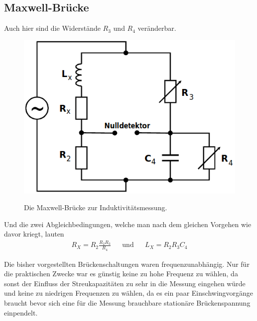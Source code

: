 \documentclass[titlepage = firstcover]{scrartcl}
\begin{document}
        \newpage

        \subsection{Maxwell-Brücke}
          Auch hier sind die Widerstände $R_3$ und $R_4$ veränderbar.
          \begin{figure}[h]
            \centering
            \caption{Die Maxwell-Brücke zur Induktivitätsmessung.}
            \includegraphics[width = 0.5\linewidth]{Maxwellbruecke.png}
            \label{fig:maxwellbr}
          \end{figure}
          Und die zwei Abgleichbedingungen, welche man nach dem gleichen Vorgehen wie davor kriegt, lauten
          \begin{align}
            R_X = R_2 \frac{R_2 R_3}{R_4} &&\text{und}&& L_X = R_2 R_3 C_4             
          \end{align}
          \FloatBarrier

      \noindent
      Die bisher vorgestellten Brückenschaltungen waren frequenzunabhängig. Nur für die praktischen Zwecke war es günstig keine zu hohe Frequenz zu wählen,
      da sonst der Einfluss der Streukapazitäten zu sehr in die Messung eingehen würde und keine zu niedrigen Frequenzen zu wählen, da es ein paar
      Einschwingvorgänge braucht bevor sich eine für die Messung brauchbare stationäre Brückenspannung einpendelt.
\end{document}
